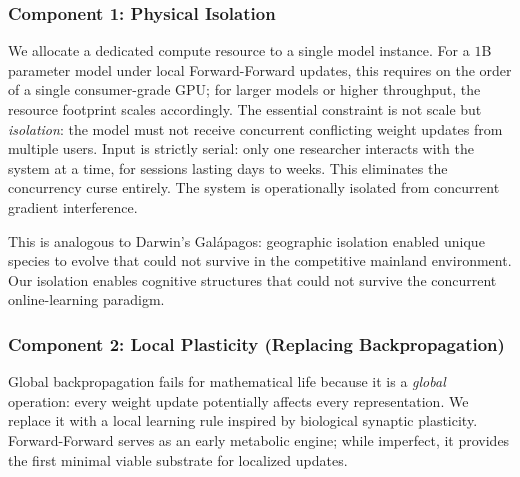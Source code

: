 \documentclass{article}
\begin{document}
\subsubsection{Component 1: Physical Isolation}

We allocate a dedicated compute resource to a single model instance. For a $1$B parameter model under local Forward-Forward updates, this requires on the order of a single consumer-grade GPU; for larger models or higher throughput, the resource footprint scales accordingly. The essential constraint is not scale but \emph{isolation}: the model must not receive concurrent conflicting weight updates from multiple users. Input is strictly serial: only one researcher interacts with the system at a time, for sessions lasting days to weeks. This eliminates the concurrency curse entirely. The system is operationally isolated from concurrent gradient interference.

This is analogous to Darwin's Galápagos: geographic isolation enabled unique species to evolve that could not survive in the competitive mainland environment. Our isolation enables cognitive structures that could not survive the concurrent online-learning paradigm.

\subsubsection{Component 2: Local Plasticity (Replacing Backpropagation)}

Global backpropagation fails for mathematical life because it is a \emph{global} operation: every weight update potentially affects every representation. We replace it with a local learning rule inspired by biological synaptic plasticity. Forward-Forward serves as an early metabolic engine; while imperfect, it provides the first minimal viable substrate for localized updates.
\end{document}
